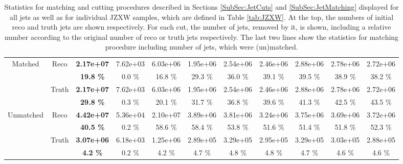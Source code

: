 \begin{appendices}
\begin{landscape}
\begin{table}
\begin{tabular}{|c|c|>{\bfseries}c|c|c|c|c|c|c|c|c|}
    \hline                                                                                      
    \hline                                                                                      
    \multirow{4}{*}{Matched}        & \multirow{2}{*}{Reco}   & 2.17e+07 & 7.62e+03 & 6.03e+06 & 1.95e+06 & 2.54e+06 & 2.46e+06 & 2.88e+06 & 2.78e+06 & 2.72e+06 \\
                                    &                           & 19.8 \%  & 0.0 \%   & 16.8 \%  & 29.3 \%  & 36.0 \%  & 39.1 \%  & 39.5 \%  & 38.9 \%  & 38.2 \%  \\
    \cline{2-11}                                                                                    
                                    & \multirow{2}{*}{Truth}    & 2.17e+07 & 7.62e+03 & 6.03e+06 & 1.95e+06 & 2.54e+06 & 2.46e+06 & 2.88e+06 & 2.78e+06 & 2.72e+06 \\
                                    &                           & 29.8 \%  & 0.3 \%   & 20.1 \%  & 31.7 \%  & 36.8 \%  & 39.6 \%  & 41.3 \%  & 42.5 \%  & 43.5 \%  \\
    \hline                                                                                      
    \hline                                                                                      
    \multirow{4}{*}{Unmatched}      & \multirow{2}{*}{Reco}   & 4.42e+07 & 5.36e+04 & 2.10e+07 & 3.89e+06 & 3.81e+06 & 3.24e+06 & 3.75e+06 & 3.69e+06 & 3.72e+06 \\
                                    &                           & 40.5 \%  & 0.2 \%   & 58.6 \%  & 58.4 \%  & 53.8 \%  & 51.6 \%  & 51.4 \%  & 51.8 \%  & 52.3 \%  \\
    \cline{2-11}                                                                                    
                                    & \multirow{2}{*}{Truth}    & 3.07e+06 & 6.18e+03 & 1.25e+06 & 2.89e+05 & 3.29e+05 & 2.95e+05 & 3.29e+05 & 3.03e+05 & 2.88e+05 \\
                                    &                           & 4.2 \%   & 0.2 \%   & 4.2 \%   & 4.7 \%   & 4.8 \%   & 4.8 \%   & 4.7 \%   & 4.6 \%   & 4.6 \%   \\
    \hline
  \end{tabular}
  \caption{Statistics for matching and cutting procedures described in Sections
    \ref{SubSec:JetCuts} and \ref{SubSec:JetMatching} displayed for all jets as
    well as for individual JZXW samples, which are defined in Table \ref{tab:JZXW}. At the top, the
    numbers of initial reco and truth jets are shown respectively. For each cut,
    the number of jets, removed by it, is shown, including a relative number
    according to the original number of reco or truth jets respectively.
    The last two lines show the statistics for matching procedure including number of
    jets, which were (un)matched.}
  \label{tab:CutAndMatchingEfficiency}
\end{table} 
\end{landscape}


\end{appendices}
